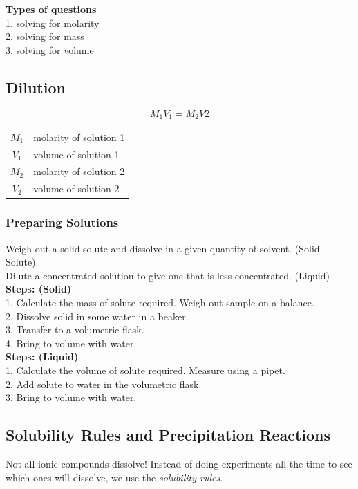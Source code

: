 \documentclass[11pt]{article}
\begin{document}
    \textbf{Types of questions} \\
    1. solving for molarity \\
    2. solving for mass \\
    3. solving for volume

    \subsection{Dilution}

    \begin{equation*}
        M_{1}V_{1} = M_{2}V{2}
    \end{equation*}

    \begin{center}
        \begin{tabular}{c l}
            $M_{1}$ & molarity of solution 1 \\
            $V_{1}$ & volume of solution 1 \\
            $M_{2}$ & molarity of solution 2 \\
            $V_{2}$ & volume of solution 2
        \end{tabular}
    \end{center}

    \subsubsection{Preparing Solutions}
    Weigh out a solid solute and dissolve in a given quantity of solvent. (Solid Solute). \\
    Dilute a concentrated solution to give one that is less concentrated. (Liquid) \\
    \break
    \textbf{Steps: (Solid)} \\
    1. Calculate the mass of solute required. Weigh out sample on a balance. \\
    2. Dissolve solid in some water in a beaker. \\
    3. Transfer to a volumetric flask. \\
    4. Bring to volume with water.\\
    \break
    \textbf{Steps: (Liquid)} \\
    1. Calculate the volume of solute required. Measure using a pipet. \\
    2. Add solute to water in the volumetric flask. \\
    3. Bring to volume with water.

    \subsection{Solubility Rules and Precipitation Reactions}
    Not all ionic compounds dissolve! Instead of doing experiments all the time to see which ones will dissolve, we use the \emph{solubility rules}.
\end{document}
